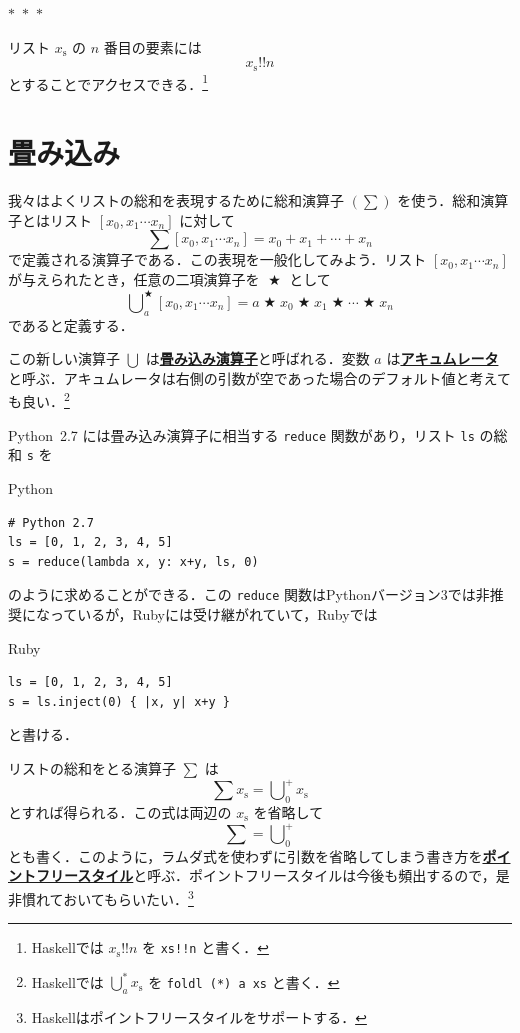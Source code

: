 \documentclass[a5paper,twoside,fleqn,draft]{jsbook}
\newcommand{\separator}{\begin{center}$*$~$*$~$*$\end{center}}
\newcommand{\programminglanguage}[1]{\textsf{#1}}
\newcommand{\haskell}{\programminglanguage{Haskell}}
\newcommand{\python}{\programminglanguage{Python}}
\newcommand{\ruby}{\programminglanguage{Ruby}}
\newcommand{\keyword}[1]{{\underline{\textbf{#1}}}}
\newcommand{\code}[1]{\texttt{#1}}
\newenvironment{pythoncode}{\begin{itembox}[r]{\python}}{\end{itembox}}
\newenvironment{rubycode}{\begin{itembox}[r]{\ruby}}{\end{itembox}}
\DeclareMathOperator{\mBinOp}{\bigstar}
\DeclareMathOperator*{\mFold}{\bigcup}
\DeclareMathOperator{\mListAt}{!!}
\newcommand{\mList}[1]{{#1}_\mathrm{s}}
\begin{document}
\separator

リスト $\mList{x}$ の $n$ 番目の要素には
\begin{equation}
  \mList{x}\mListAt n
\end{equation}
とすることでアクセスできる．\footnote{\haskell では $\mList{x}\mListAt n$ を \code{xs!!n} と書く．}

\section{畳み込み}
\label{sec:convolution}

我々はよくリストの総和を表現するために総和演算子 $(\sum)$ を使う．総和演算子とはリスト $[x_0,x_1\dotsb x_n]$ に対して
\begin{equation}
  \sum[x_0,x_1\dotsb x_n]
  =x_0+x_1+\dotsb+x_n
\end{equation}
で定義される演算子である．この表現を一般化してみよう．リスト $[x_0,x_1\dotsb x_n]$ が与えられたとき，任意の二項演算子を $\mBinOp$ として
\begin{equation}
  \mFold^{\mBinOp}_a[x_0,x_1\dotsb x_n]
  =a\mBinOp x_0\mBinOp x_1\mBinOp\dotsb\mBinOp x_n
\end{equation}
であると定義する．

この新しい演算子 $\mFold$ は\keyword{畳み込み演算子}と呼ばれる．変数 $a$ は\keyword{アキュムレータ}と呼ぶ．アキュムレータは右側の引数が空であった場合のデフォルト値と考えても良い．\footnote{\haskell では $\mFold^*_a\mList{x}$ を \code{foldl (*) a xs} と書く．}

\python\ 2.7 には畳み込み演算子に相当する \code{reduce} 関数があり，リスト \code{ls} の総和 \code{s} を
\begin{pythoncode}
\begin{verbatim}
# Python 2.7
ls = [0, 1, 2, 3, 4, 5]
s = reduce(lambda x, y: x+y, ls, 0)
\end{verbatim}
\end{pythoncode}
のように求めることができる．この \code{reduce} 関数は\python バージョン3では非推奨になっているが，\ruby には受け継がれていて，\ruby では
\begin{rubycode}
\begin{verbatim}
ls = [0, 1, 2, 3, 4, 5]
s = ls.inject(0) { |x, y| x+y }
\end{verbatim}
\end{rubycode}
と書ける．

リストの総和をとる演算子 $\sum$ は
\begin{equation}
  \sum\mList{x}
  =\mFold^+_0\mList{x}
\end{equation}
とすれば得られる．この式は両辺の $\mList{x}$ を省略して
\begin{equation}
  \sum
  =\mFold^+_0
\end{equation}
とも書く．このように，ラムダ式を使わずに引数を省略してしまう書き方を\keyword{ポイントフリースタイル}と呼ぶ．ポイントフリースタイルは今後も頻出するので，是非慣れておいてもらいたい．\footnote{\haskell はポイントフリースタイルをサポートする．}
\end{document}
